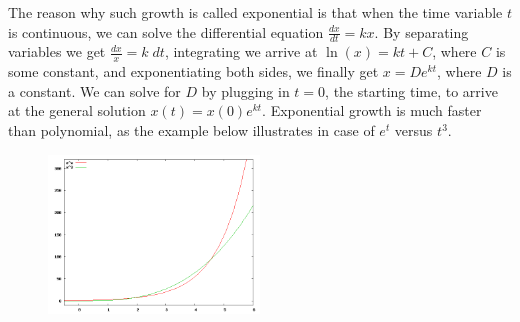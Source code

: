 The reason why such growth is called exponential is that when the time variable $t$ is continuous, we can solve the differential equation $\frac{dx}{dt}=kx$. By separating variables we get $\frac{dx}{x}=k\;dt$, integrating we arrive at $\ln(x)=kt+C$, where $C$ is some constant, and exponentiating both sides, we finally get $x=De^{kt}$, where $D$ is a constant. We can solve for $D$ by plugging in $t=0$, the starting time, to arrive at the general solution $x(t)=x(0)e^{kt}$. Exponential growth is much faster than polynomial, as the example below illustrates in case of $e^t$ versus $t^3$. \\

	\begin{figure}[H]
	   \centering
	   \includegraphics[width=0.5\textwidth]{season1/109/images/109e8.png} 
	\end{figure}

 \vspace{0.2cm}

